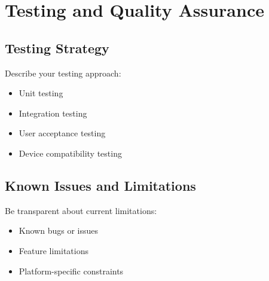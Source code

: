 \section{Testing and Quality Assurance}

\subsection{Testing Strategy}
Describe your testing approach:
\begin{itemize}
    \item Unit testing
    \item Integration testing
    \item User acceptance testing
    \item Device compatibility testing
\end{itemize}

\subsection{Known Issues and Limitations}
Be transparent about current limitations:
\begin{itemize}
    \item Known bugs or issues
    \item Feature limitations
    \item Platform-specific constraints
\end{itemize}